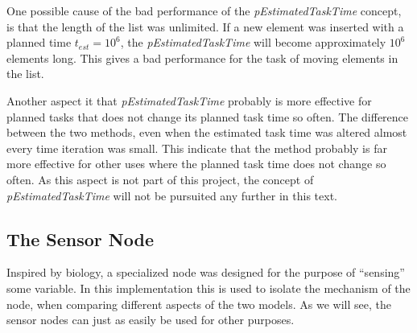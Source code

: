 	One possible cause of the bad performance of the \emph{pEstimatedTaskTime} concept, is that the length of the list was unlimited.
	If a new element was inserted with a planned time $t_{est} = 10^6$, the \emph{pEstimatedTaskTime} will become approximately $10^6$ elements long.
	This gives a bad performance for the task of moving elements in the list.

	Another aspect it that \emph{pEstimatedTaskTime} probably is more effective for planned tasks that does not change its planned task time so often. 
	The difference between the two methods, even when the estimated task time was altered almost every time iteration was small.
	This indicate that the method probably is far more effective for other uses where the planned task time does not change so often.
	As this aspect is not part of this project, the concept of \emph{pEstimatedTaskTime} will not be pursuited any further in this text.




	\subsection{The Sensor Node}
	\label{ssecTheSensorNode}
	Inspired by biology, a specialized node was designed for the purpose of ``sensing'' some variable.
	In this implementation this is used to isolate the mechanism of the node, when comparing different aspects of the two models.
	As we will see, the sensor nodes can just as easily be used for other purposes.

